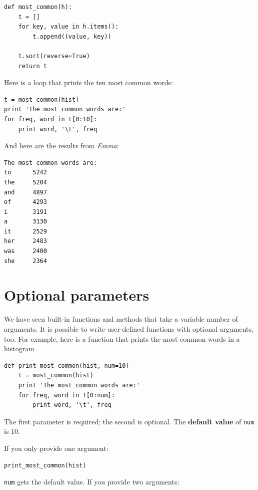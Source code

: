 \beforeverb
\begin{verbatim}
def most_common(h):
    t = []
    for key, value in h.items():
        t.append((value, key))

    t.sort(reverse=True)
    return t
\end{verbatim}
\afterverb
%
Here is a loop that prints the ten most common words:

\beforeverb
\begin{verbatim}
t = most_common(hist)
print 'The most common words are:'
for freq, word in t[0:10]:
    print word, '\t', freq
\end{verbatim}
\afterverb
%
And here are the results from {\em Emma}:

\beforeverb
\begin{verbatim}
The most common words are:
to      5242
the     5204
and     4897
of      4293
i       3191
a       3130
it      2529
her     2483
was     2400
she     2364
\end{verbatim}
\afterverb
%

\section{Optional parameters}


We have seen built-in functions and methods that take a variable
number of arguments.  It is possible to write user-defined functions
with optional arguments, too.  For example, here is a function that
prints the most common words in a histogram

\beforeverb
\begin{verbatim}
def print_most_common(hist, num=10)
    t = most_common(hist)
    print 'The most common words are:'
    for freq, word in t[0:num]:
        print word, '\t', freq
\end{verbatim}
\afterverb

The first parameter is required; the second is optional.
The {\bf default value} of {\tt num} is 10.


If you only provide one argument:

\beforeverb
\begin{verbatim}
print_most_common(hist)
\end{verbatim}
\afterverb

{\tt num} gets the default value.  If you provide two arguments:

